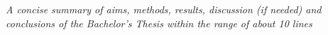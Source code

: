 \textit{A concise summary of aims, methods, results, discussion (if needed) and conclusions of the Bachelor’s Thesis within the range of about 10 lines}